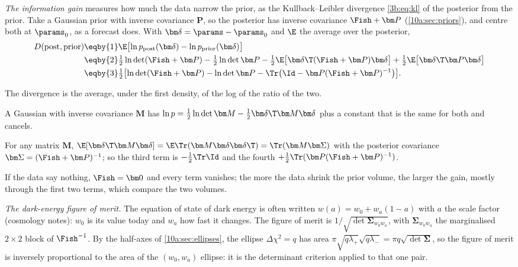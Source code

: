 \emph{The information gain} measures how much the data narrow the prior, as the Kullback--Leibler divergence
\eqref{3b:eq:kl} of the posterior from the prior. Take a Gaussian prior with inverse covariance $\bm P$, so the
posterior has inverse covariance $\Fish+\bm P$ (\cref{10a:sec:priors}), and centre both at $\params_0$, as a forecast
does. With $\bm\delta=\params-\params_0$ and $\E$ the average over the posterior,
\begin{align*}
  D(\text{post},\text{prior})
  &\eqby{1}\E\bigl[\ln p_{\rm post}(\bm\delta)-\ln p_{\rm prior}(\bm\delta)\bigr]
  \\
  &\eqby{2}\tfrac12\ln\det(\Fish+\bm P)-\tfrac12\ln\det\bm P
    -\tfrac12\E\bigl[\bm\delta\T(\Fish+\bm P)\bm\delta\bigr]+\tfrac12\E\bigl[\bm\delta\T\bm P\bm\delta\bigr]
  \\
  &\eqby{3}\tfrac12\bigl[\ln\det(\Fish+\bm P)-\ln\det\bm P-\Tr\bigl(\Id-\bm P(\Fish+\bm P)^{-1}\bigr)\bigr].
\end{align*}
\begin{explain}
  \item The divergence is the average, under the first density, of the log of the ratio of the two.
  \item A Gaussian with inverse covariance $\bm M$ has $\ln p=\frac12\ln\det\bm M-\frac12\bm\delta\T\bm M\bm\delta$ plus a constant
        that is the same for both and cancels.
  \item For any matrix $\bm M$, $\E[\bm\delta\T\bm M\bm\delta]=\E\Tr(\bm M\bm\delta\bm\delta\T)=\Tr(\bm M\bm\Sigma)$ with the posterior covariance
        $\bm\Sigma=(\Fish+\bm P)^{-1}$; so the third term is $-\frac12\Tr\Id$ and the fourth $+\frac12\Tr(\bm P(\Fish+\bm P)^{-1})$.
\end{explain}
If the data say nothing, $\Fish=\bm0$ and every term vanishes; the more the data shrink the prior volume, the
larger the gain, mostly through the first two terms, which compare the two volumes.

\emph{The dark-energy figure of merit.} The equation of state of dark energy is often written
$w(a)=w_0+w_a(1-a)$ with $a$ the scale factor (cosmology notes): $w_0$ is its value today and $w_a$ how fast it
changes. The figure of merit is $1/\sqrt{\det\bm\Sigma_{w_0w_a}}$, with $\bm\Sigma_{w_0w_a}$ the marginalised $2\times2$ block of $\Fish^{-1}$.
By the half-axes of \cref{10a:sec:ellipses}, the ellipse $\Delta\chi^2=q$ has area $\pi\sqrt{q\lambda_+}\sqrt{q\lambda_-}=\pi q\sqrt{\det\bm\Sigma}$, so
the figure of merit is inversely proportional to the area of the $(w_0,w_a)$ ellipse: it is the determinant
criterion applied to that one pair.

